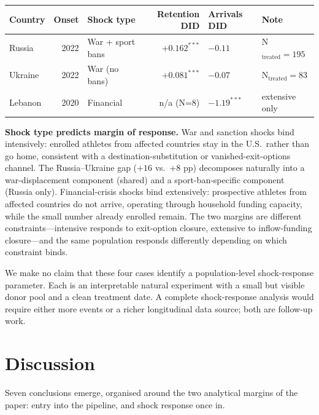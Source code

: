 \documentclass[11pt]{article}
\begin{document}
\begin{center}
\small
\begin{tabular}{lrlrll}
\toprule
Country  & Onset & Shock type        & Retention DID & Arrivals DID & Note \\
\midrule
Russia   & 2022  & War + sport bans  & $\mathbf{+0.162^{***}}$ & $-0.11$        & N$_{\text{treated}} = 195$ \\
Ukraine  & 2022  & War (no bans)     & $\mathbf{+0.081^{***}}$ & $-0.07$        & N$_{\text{treated}} = 83$ \\
Lebanon  & 2020  & Financial         & n/a (N=8)               & $\mathbf{-1.19^{***}}$ & extensive only \\
\bottomrule
\end{tabular}
\end{center}

\noindent \textbf{Shock type predicts margin of response.} War and
sanction shocks bind intensively: enrolled athletes from affected
countries stay in the U.S.\ rather than go home, consistent with a
destination-substitution or vanished-exit-options channel. The
Russia--Ukraine gap ($+16$ vs.\ $+8$ pp) decomposes naturally into
a war-displacement component (shared) and a sport-ban-specific
component (Russia only). Financial-crisis shocks bind extensively:
prospective athletes from affected countries do not arrive,
operating through household funding capacity, while the small
number already enrolled remain. The two margins are different
constraints---intensive responds to exit-option closure, extensive
to inflow-funding closure---and the same population responds
differently depending on which constraint binds.

We make no claim that these four cases identify a population-level
shock-response parameter. Each is an interpretable natural
experiment with a small but visible donor pool and a clean treatment
date. A complete shock-response analysis would require either
more events or a richer longitudinal data source; both are
follow-up work.
\section{Discussion}
\label{sec:discussion}

Seven conclusions emerge, organised around the two analytical
margins of the paper: entry into the pipeline, and shock response
once in.
\end{document}
